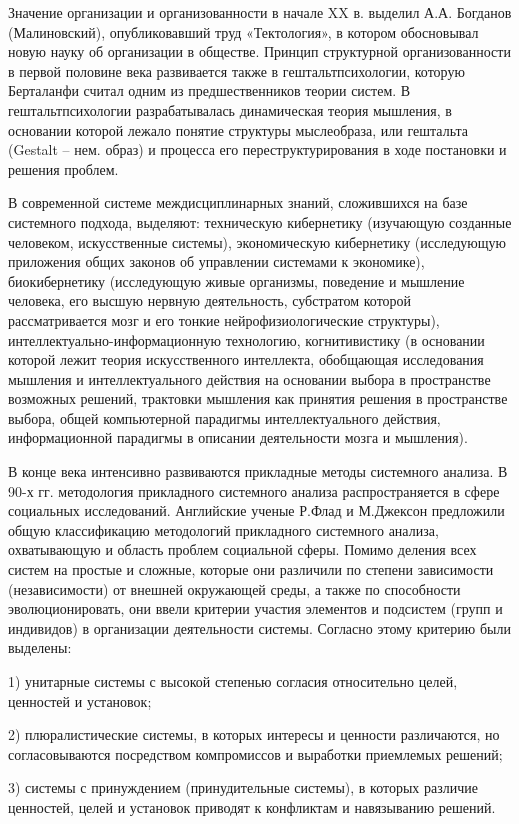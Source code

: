 \documentclass[exam_answers.tex]{subfiles}
\begin{document}
Значение организации и организованности в начале XX в. выделил А.А.
Богданов (Малиновский), опубликовавший труд «Тектология», в котором
обосновывал новую науку об организации в обществе. Принцип структурной
организованности в первой половине века развивается также в
гештальтпсихологии, которую Берталанфи считал одним из предшественников
теории систем. В гештальтпсихологии разрабатывалась динамическая теория
мышления, в основании которой лежало понятие структуры мыслеобраза, или
гештальта (Gestalt – нем. образ) и процесса его переструктурирования в ходе
постановки и решения проблем.

В современной системе междисциплинарных знаний, сложившихся на базе
системного подхода, выделяют: техническую кибернетику (изучающую
созданные человеком, искусственные системы), экономическую кибернетику
(исследующую приложения общих законов об управлении системами к
экономике), биокибернетику (исследующую живые организмы, поведение и
мышление человека, его высшую нервную деятельность, субстратом которой
рассматривается мозг и его тонкие нейрофизиологические структуры),
интеллектуально-информационную технологию, когнитивистику (в основании
которой лежит теория искусственного интеллекта, обобщающая исследования
мышления и интеллектуального действия на основании выбора в пространстве
возможных решений, трактовки мышления как принятия решения в
пространстве выбора, общей компьютерной парадигмы интеллектуального
действия, информационной парадигмы в описании деятельности мозга и
мышления).

В конце века интенсивно развиваются прикладные методы системного
анализа. В 90-х гг. методология прикладного системного анализа
распространяется в сфере социальных исследований. Английские ученые
Р.Флад и М.Джексон предложили общую классификацию методологий
прикладного системного анализа, охватывающую и область проблем 
социальной сферы. Помимо деления всех систем на простые и сложные,
которые они различили по степени зависимости (независимости) от внешней
окружающей среды, а также по способности эволюционировать, они ввели
критерии участия элементов и подсистем (групп и индивидов) в организации
деятельности системы. Согласно этому критерию были выделены:

1) унитарные системы с высокой степенью согласия относительно
целей, ценностей и установок;

2) плюралистические системы, в которых интересы и ценности
различаются, но согласовываются посредством компромиссов и выработки
приемлемых решений;

3) системы с принуждением (принудительные системы), в которых
различие ценностей, целей и установок приводят к конфликтам и навязыванию
решений.
\end{document}
